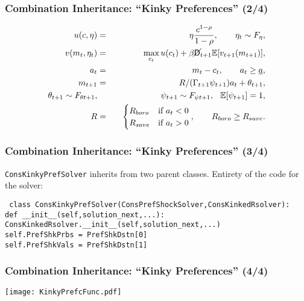 \documentclass[11ptt]{beamer}
\newcommand{\E}{\mathbb{E}}
\newcommand{\Die}{\mathsf{D}}
\newcommand{\Live}{\cancel{\Die}}
\begin{document}
\begin{frame}
\frametitle{Combination Inheritance: ``Kinky Preferences'' (2/4)}
\begin{eqnarray*}
u(c,\eta) &=& \eta \frac{c^{1-\rho}}{1-\rho}, \qquad \eta_t \sim F_{\eta},\\
v(m_t,\eta_t) &=& \max_{c_t} u(c_t) + \beta \Live_{t+1} \E [v_{t+1}(m_{t+1}) ], \\
a_t &=& m_t - c_t, \qquad a_t \geq \underline{a}, \\
m_{t+1} &=& R/(\Gamma_{t+1} \psi_{t+1}) a_t + \theta_{t+1}, \\
\theta_{t+1} \sim F_{\theta t+1}, &\qquad& \psi_{t+1} \sim F_{\psi t+1}, \hspace{0.25cm} \E[\psi_{t+1}] = 1, \\
R &=& \begin{cases}
R_{boro} & \text{if  } a_t < 0 \\
R_{save} & \text{if  } a_t > 0
\end{cases}, \qquad R_{boro} \geq R_{save}.
\end{eqnarray*}
\end{frame}

\begin{frame}
\frametitle{Combination Inheritance: ``Kinky Preferences'' (3/4)}
\texttt{ConsKinkyPrefSolver} inherits from two parent classes.  Entirety of the code for the solver:

\scriptsize{
\texttt{
class ConsKinkyPrefSolver(ConsPrefShockSolver,ConsKinkedRsolver):\\
\qquad def \_\_init\_\_(self,solution\_next,...):\\
\qquad \qquad ConsKinkedRsolver.\_\_init\_\_(self,solution\_next,...)\\
\qquad \qquad self.PrefShkPrbs = PrefShkDstn[0]\\
\qquad \qquad self.PrefShkVals = PrefShkDstn[1]\\
}}
\end{frame}


\begin{frame}
\frametitle{Combination Inheritance: ``Kinky Preferences'' (4/4)}
\hyperlink{DiscussionTopics}{}

\begin{center}
\texttt{[image: KinkyPrefcFunc.pdf]}
\end{center}

\end{frame}
\end{document}

